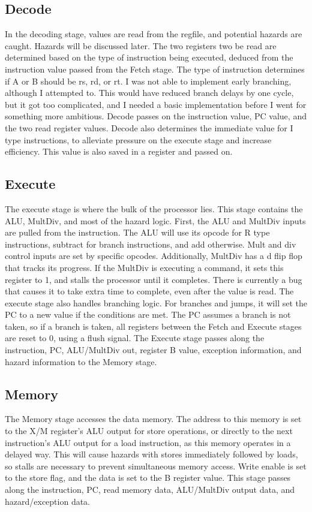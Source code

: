 \documentclass[letterpaper]{article} %
\begin{document}
\subsection*{Decode}
In the decoding stage, values are read from the regfile, and potential hazards are caught. Hazards will be discussed later. The two registers two be read are determined based on the type of instruction being executed, deduced from the instruction value passed from the Fetch stage. The type of instruction determines if A or B should be rs, rd, or rt. I was not able to implement early branching, although I attempted to. This would have reduced branch delays by one cycle, but it got too complicated, and I needed a basic implementation before I went for something more ambitious. Decode passes on the instruction value, PC value, and the two read register values. Decode also determines the immediate value for I type instructions, to alleviate pressure on the execute stage and increase efficiency. This value is also saved in a register and passed on. \\

\subsection*{Execute}
The execute stage is where the bulk of the processor lies. This stage contains the ALU, MultDiv, and most of the hazard logic. First, the ALU and MultDiv inputs are pulled from the instruction. The ALU will use its opcode for R type instructions, subtract for branch instructions, and add otherwise. Mult and div control inputs are set by specific opcodes. Additionally, MultDiv has a d flip flop that tracks its progress. If the MultDiv is executing a command, it sets this register to 1, and stalls the processor until it completes. There is currently a bug that causes it to take extra time to complete, even after the value is read. The execute stage also handles branching logic. For branches and jumps, it will set the PC to a new value if the conditions are met. The PC assumes a branch is not taken, so if a branch is taken, all registers between the Fetch and Execute stages are reset to 0, using a flush signal. The Execute stage passes along the instruction, PC, ALU/MultDiv out, register B value, exception information, and hazard information to the Memory stage. \\

\subsection*{Memory}
The Memory stage accesses the data memory. The address to this memory is set to the X/M register's ALU output for store operations, or directly to the next instruction's ALU output for a load instruction, as this memory operates in a delayed way. This will cause hazards with stores immediately followed by loads, so stalls are necessary to prevent simultaneous memory access. Write enable is set to the store flag, and the data is set to the B register value. This stage passes along the instruction, PC, read memory data, ALU/MultDiv output data, and hazard/exception data. \\
\end{document}
